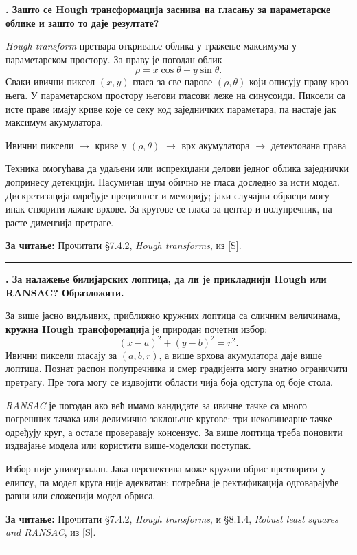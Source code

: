 \documentclass[10pt,a4paper]{article}
\newcommand{\en}[1]{\textit{#1}}
\newcounter{pitanje}
\newenvironment{odgovor}[1]{\stepcounter{pitanje}\begin{minipage}[t][0.455\textheight][t]{\textwidth}\vspace{0pt}\textbf{\thepitanje. #1}\par\smallskip}{\end{minipage}\par\ifodd\value{pitanje}\vspace{0.025\textheight}\hrule\vspace{0.015\textheight}\else\newpage\fi}
\newcommand{\izvor}[1]{\par\vfill{\footnotesize\textbf{За читање:} #1}\par}
\newcommand{\lanac}[1]{\begin{center}\small #1\end{center}}
\begin{document}
\begin{odgovor}{Зашто се Hough трансформација заснива на гласању за параметарске облике и зашто то даје резултате?}
\en{Hough transform} претвара откривање облика у тражење максимума у параметарском простору. За праву је погодан облик
\[
\rho=x\cos\theta+y\sin\theta.
\]
Сваки ивични пиксел $(x,y)$ гласа за све парове $(\rho,\theta)$ који описују праву кроз њега. У параметарском простору његови гласови леже на синусоиди. Пиксели са исте праве имају криве које се секу код заједничких параметара, па настаје јак максимум акумулатора.
\lanac{Ивични пиксели $\to$ криве у $(\rho,\theta)$ $\to$ врх акумулатора $\to$ детектована права}
Техника омогућава да удаљени или испрекидани делови једног облика заједнички допринесу детекцији. Насумичан шум обично не гласа доследно за исти модел. Дискретизација одређује прецизност и меморију; јаки случајни обрасци могу ипак створити лажне врхове. За кругове се гласа за центар и полупречник, па расте димензија претраге.
\izvor{Прочитати §7.4.2, \en{Hough transforms}, из [S].}
\end{odgovor}

\begin{odgovor}{За налажење билијарских лоптица, да ли је прикладнији Hough или RANSAC? Образложити.}
За више јасно видљивих, приближно кружних лоптица са сличним величинама, \textbf{кружна Hough трансформација} је природан почетни избор:
\[
(x-a)^2+(y-b)^2=r^2.
\]
Ивични пиксели гласају за $(a,b,r)$, а више врхова акумулатора даје више лоптица. Познат распон полупречника и смер градијента могу знатно ограничити претрагу. Пре тога могу се издвојити области чија боја одступа од боје стола.

\en{RANSAC} је погодан ако већ имамо кандидате за ивичне тачке са много погрешних тачака или делимично заклоњене кругове: три неколинеарне тачке одређују круг, а остале проверавају консензус. За више лоптица треба поновити издвајање модела или користити више-моделски поступак.

Избор није универзалан. Јака перспектива може кружни обрис претворити у елипсу, па модел круга није адекватан; потребна је ректификација одговарајуће равни или сложенији модел обриса.
\izvor{Прочитати §7.4.2, \en{Hough transforms}, и §8.1.4, \en{Robust least squares and RANSAC}, из [S].}
\end{odgovor}
\end{document}
